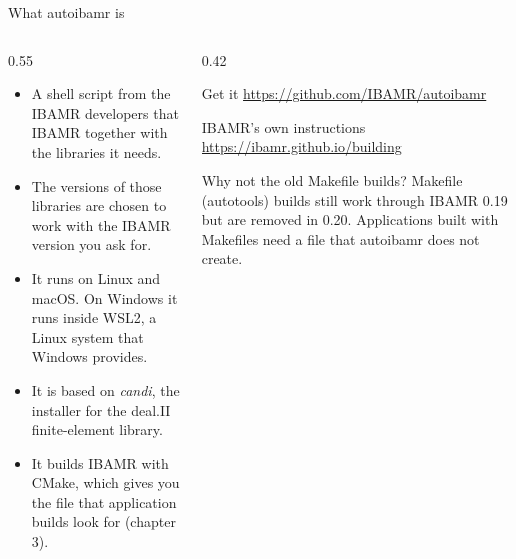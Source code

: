 \documentclass[aspectratio=169,11pt]{beamer}
\begin{document}
\begin{frame}{What autoibamr is}
\begin{columns}[T,onlytextwidth]
\begin{column}{0.55\textwidth}
\begin{itemize}
  \item A shell script from the IBAMR developers that  IBAMR together with the libraries it needs.
  \item The versions of those libraries are chosen to work with the IBAMR version you ask for.
  \item It runs on Linux and macOS. On Windows it runs inside WSL2, a Linux system that Windows provides.
  \item It is based on \emph{candi}, the installer for the deal.II finite-element library.
  \item It builds IBAMR with CMake, which gives you the  file that application builds look for (chapter 3).
\end{itemize}
\end{column}
\begin{column}{0.42\textwidth}
\begin{block}{Get it}
\small\url{https://github.com/IBAMR/autoibamr}
\end{block}
\begin{block}{IBAMR's own instructions}
\small\url{https://ibamr.github.io/building}
\end{block}
\begin{alertblock}{Why not the old Makefile builds?}
\small Makefile (autotools) builds still work through IBAMR 0.19 but are removed in 0.20. Applications built with Makefiles need a  file that autoibamr does not create.
\end{alertblock}
\end{column}
\end{columns}
\end{frame}
\end{document}
